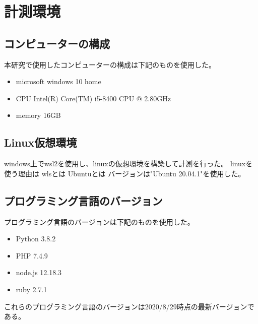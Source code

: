 \chapter{計測環境}
\label{cha:environment}
\section{コンピューターの構成}
本研究で使用したコンピューターの構成は下記のものを使用した。
\begin{itemize}
  \item microsoft windows 10 home
  \item CPU Intel(R) Core(TM) i5-8400 CPU @ 2.80GHz
  \item memory 16GB
\end{itemize}

\section{Linux仮想環境}
windows上でwsl2を使用し、linuxの仮想環境を構築して計測を行った。
linuxを使う理由は
wlsとは
Ubuntuとは
\cite{Ubuntu}
バージョンは"Ubuntu 20.04.1"を使用した。

\section{プログラミング言語のバージョン}
プログラミング言語のバージョンは下記のものを使用した。
\begin{itemize}
  \item Python 3.8.2
  \item PHP 7.4.9
　\item node.js 12.18.3
  \item ruby 2.7.1
\end{itemize}
これらのプログラミング言語のバージョンは2020/8/29時点の最新バージョンである。